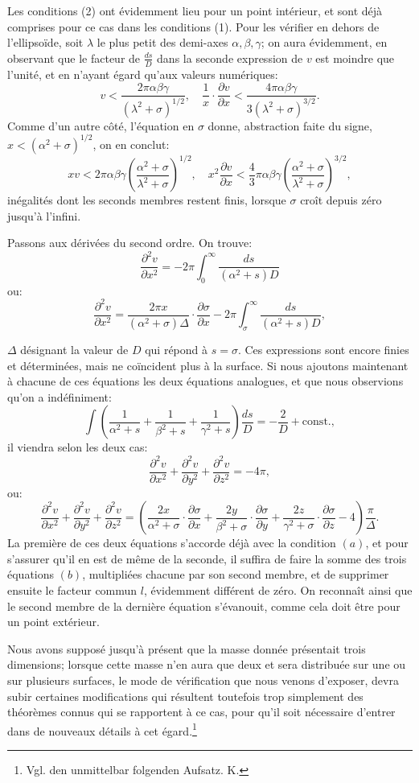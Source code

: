 \documentclass[11pt]{article}
\begin{document}
Les conditions (2) ont évidemment lieu pour un point intérieur, et sont déjà comprises pour ce cas dans les conditions (1). Pour les vérifier en dehors de l'ellipsoïde, soit $\lambda$ le plus petit des demi-axes $\alpha,\beta,\gamma$; on aura évidemment, en observant que le facteur de $\frac{ds}{D}$ dans la seconde expression de $v$ est moindre que l'unité, et en n'ayant égard qu'aux valeurs numériques:
\[
 v<\frac{2\pi\alpha\beta\gamma}{(\lambda^2+\sigma)^{1/2}},\quad
 \frac{1}{x}\cdot\frac{\partial v}{\partial x}<\frac{4\pi\alpha\beta\gamma}{3(\lambda^2+\sigma)^{3/2}}.
\]
Comme d'un autre côté, l'équation en $\sigma$ donne, abstraction faite du signe, $x<(\alpha^2+\sigma)^{1/2}$, on en conclut:
\[
 xv<2\pi\alpha\beta\gamma\left(\frac{\alpha^2+\sigma}{\lambda^2+\sigma}\right)^{1/2},\quad
 x^2\frac{\partial v}{\partial x}<\frac{4}{3}\pi\alpha\beta\gamma\left(\frac{\alpha^2+\sigma}{\lambda^2+\sigma}\right)^{3/2},
\]
inégalités dont les seconds membres restent finis, lorsque $\sigma$ croît depuis zéro jusqu'à l'infini.

Passons aux dérivées du second ordre. On trouve:
\[
\frac{\partial^2 v}{\partial x^2}=-2\pi\int_0^\infty\frac{ds}{(\alpha^2+s)D}
\]
ou:
\[
\frac{\partial^2 v}{\partial x^2}=\frac{2\pi x}{(\alpha^2+\sigma)\Delta}\cdot\frac{\partial\sigma}{\partial x}-2\pi\int_\sigma^\infty\frac{ds}{(\alpha^2+s)D},
\]

$\Delta$ désignant la valeur de $D$ qui répond à $s=\sigma$. Ces expressions sont encore finies et déterminées, mais ne coïncident plus à la surface. Si nous ajoutons maintenant à chacune de ces équations les deux équations analogues, et que nous observions qu'on a indéfiniment:
\[
\int\left(\frac{1}{\alpha^2+s}+\frac{1}{\beta^2+s}+\frac{1}{\gamma^2+s}\right)\frac{ds}{D}=-\frac{2}{D}+\mathrm{const.},
\]
il viendra selon les deux cas:
\[
\frac{\partial^2 v}{\partial x^2}+\frac{\partial^2 v}{\partial y^2}+\frac{\partial^2 v}{\partial z^2}=-4\pi,
\]
ou:
\[
\frac{\partial^2 v}{\partial x^2}+\frac{\partial^2 v}{\partial y^2}+\frac{\partial^2 v}{\partial z^2}
=\left(\frac{2x}{\alpha^2+\sigma}\cdot\frac{\partial\sigma}{\partial x}
+\frac{2y}{\beta^2+\sigma}\cdot\frac{\partial\sigma}{\partial y}
+\frac{2z}{\gamma^2+\sigma}\cdot\frac{\partial\sigma}{\partial z}-4\right)\frac{\pi}{\Delta}.
\]
La première de ces deux équations s'accorde déjà avec la condition $(a)$, et pour s'assurer qu'il en est de même de la seconde, il suffira de faire la somme des trois équations $(b)$, multipliées chacune par son second membre, et de supprimer ensuite le facteur commun $l$, évidemment différent de zéro. On reconnaît ainsi que le second membre de la dernière équation s'évanouit, comme cela doit être pour un point extérieur.

Nous avons supposé jusqu'à présent que la masse donnée présentait trois dimensions; lorsque cette masse n'en aura que deux et sera distribuée sur une ou sur plusieurs surfaces, le mode de vérification que nous venons d'exposer, devra subir certaines modifications qui résultent toutefois trop simplement des théorèmes connus qui se rapportent à ce cas, pour qu'il soit nécessaire d'entrer dans de nouveaux détails à cet égard.\footnote{Vgl. den unmittelbar folgenden Aufsatz. K.}
\end{document}
